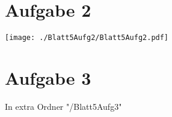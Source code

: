 \section{Aufgabe 2}
\hspace{-4cm}
\texttt{[image: ./Blatt5Aufg2/Blatt5Aufg2.pdf]}
\newpage
\section{Aufgabe 3}
In extra Ordner "/Blatt5Aufg3"
